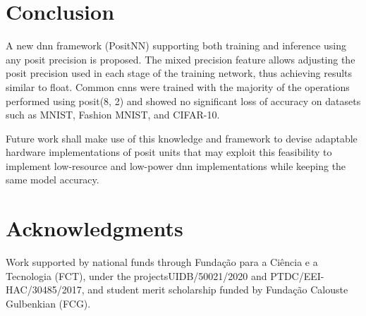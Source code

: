 \documentclass{article}
\begin{document}
	\section{Conclusion}
	
	A new \gls{dnn} framework (PositNN) supporting both training and inference using any posit precision is proposed. The mixed precision feature allows adjusting the posit precision used in each stage of the training network, thus achieving results similar to float. Common \glspl{cnn} were trained with the majority of the operations performed using posit(8, 2) and showed no significant loss of accuracy on datasets such as MNIST, Fashion MNIST, and CIFAR-10.
	
	
	Future work shall make use of this knowledge and framework to devise adaptable hardware implementations of posit units that may exploit this feasibility to implement low-resource and low-power \gls{dnn} implementations while keeping the same model accuracy.
	
	
	
	\section*{Acknowledgments}
	
	Work supported by national funds through Fundação para a Ciência e a Tecnologia (FCT), under the projects\linebreak UIDB/50021/2020 and PTDC/EEI-HAC/30485/2017, and student merit scholarship funded by Fundação Calouste Gulbenkian (FCG).
	
	\vfill\pagebreak
	
	\small
	
	
	
\end{document}
